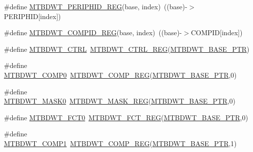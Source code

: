 \begin{DoxyCompactItemize}
\item 
\#define \hyperlink{group___m_t_b_d_w_t___register___accessor___macros_ga91f7c6dfb35fc0d26fb6b3fae63757fc}{M\+T\+B\+D\+W\+T\+\_\+\+P\+E\+R\+I\+P\+H\+I\+D\+\_\+\+R\+EG}(base,  index)~((base)-\/$>$P\+E\+R\+I\+P\+H\+ID\mbox{[}index\mbox{]})
\item 
\#define \hyperlink{group___m_t_b_d_w_t___register___accessor___macros_gaaeee0c6c32b2caddaf8ec3a96b430de0}{M\+T\+B\+D\+W\+T\+\_\+\+C\+O\+M\+P\+I\+D\+\_\+\+R\+EG}(base,  index)~((base)-\/$>$C\+O\+M\+P\+ID\mbox{[}index\mbox{]})
\item 
\#define \hyperlink{group___m_t_b_d_w_t___register___accessor___macros_gadb4142d6299394f942ea20e3b6fae17b}{M\+T\+B\+D\+W\+T\+\_\+\+C\+T\+RL}~\hyperlink{group___m_t_b_d_w_t___register___accessor___macros_gab63fe70f69879777db30d18d5407e158}{M\+T\+B\+D\+W\+T\+\_\+\+C\+T\+R\+L\+\_\+\+R\+EG}(\hyperlink{group___m_t_b_d_w_t___peripheral_ga97d048bfb5a11293a38c444b8347ff42}{M\+T\+B\+D\+W\+T\+\_\+\+B\+A\+S\+E\+\_\+\+P\+TR})
\item 
\#define \hyperlink{group___m_t_b_d_w_t___register___accessor___macros_ga8d2e850737820e0876358db17f0bd37d}{M\+T\+B\+D\+W\+T\+\_\+\+C\+O\+M\+P0}~\hyperlink{group___m_t_b_d_w_t___register___accessor___macros_ga0204594297d9a6d44fe19d610913a7aa}{M\+T\+B\+D\+W\+T\+\_\+\+C\+O\+M\+P\+\_\+\+R\+EG}(\hyperlink{group___m_t_b_d_w_t___peripheral_ga97d048bfb5a11293a38c444b8347ff42}{M\+T\+B\+D\+W\+T\+\_\+\+B\+A\+S\+E\+\_\+\+P\+TR},0)
\item 
\#define \hyperlink{group___m_t_b_d_w_t___register___accessor___macros_ga67bf35c31a64cd369ef04e88e3c10a18}{M\+T\+B\+D\+W\+T\+\_\+\+M\+A\+S\+K0}~\hyperlink{group___m_t_b_d_w_t___register___accessor___macros_ga32be33e09a6c10c58485d2beefb6facf}{M\+T\+B\+D\+W\+T\+\_\+\+M\+A\+S\+K\+\_\+\+R\+EG}(\hyperlink{group___m_t_b_d_w_t___peripheral_ga97d048bfb5a11293a38c444b8347ff42}{M\+T\+B\+D\+W\+T\+\_\+\+B\+A\+S\+E\+\_\+\+P\+TR},0)
\item 
\#define \hyperlink{group___m_t_b_d_w_t___register___accessor___macros_ga12dedaf447e980ce1562d39e22bc7636}{M\+T\+B\+D\+W\+T\+\_\+\+F\+C\+T0}~\hyperlink{group___m_t_b_d_w_t___register___accessor___macros_ga6bb0978c19eed749885efdb3c899edab}{M\+T\+B\+D\+W\+T\+\_\+\+F\+C\+T\+\_\+\+R\+EG}(\hyperlink{group___m_t_b_d_w_t___peripheral_ga97d048bfb5a11293a38c444b8347ff42}{M\+T\+B\+D\+W\+T\+\_\+\+B\+A\+S\+E\+\_\+\+P\+TR},0)
\item 
\#define \hyperlink{group___m_t_b_d_w_t___register___accessor___macros_gad33eb136896be3180b06c5ee963dc607}{M\+T\+B\+D\+W\+T\+\_\+\+C\+O\+M\+P1}~\hyperlink{group___m_t_b_d_w_t___register___accessor___macros_ga0204594297d9a6d44fe19d610913a7aa}{M\+T\+B\+D\+W\+T\+\_\+\+C\+O\+M\+P\+\_\+\+R\+EG}(\hyperlink{group___m_t_b_d_w_t___peripheral_ga97d048bfb5a11293a38c444b8347ff42}{M\+T\+B\+D\+W\+T\+\_\+\+B\+A\+S\+E\+\_\+\+P\+TR},1)

\end{DoxyCompactItemize}
